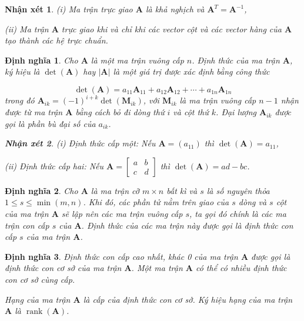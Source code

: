 \documentclass[12pt,a4paper,oneside]{report}
\newtheorem{nx}{Nhận xét}[section]
\newtheorem{dn}{Định nghĩa}[section]
\numberwithin{equation}{section}
\begin{document}
\begin{nx}
	\item[(i)] Ma trận trực giao $\mathbf{A}$ là khả nghịch và $\mathbf{A}^{T}=\mathbf{A}^{-1}$,
	
	\item[(ii)]  Ma trận $\mathbf{A}$ trực giao khi và chỉ khi các vector cột và các vector hàng của $\mathbf{A}$ tạo thành các hệ trực chuẩn.
\end{nx}
\begin{dn}\cite{hieu2019} 
	Cho $\mathbf{A}$ là một ma trận vuông cấp $n$. Định thức của ma trận $\mathbf{A}$, ký hiệu là $\operatorname{det}(\mathbf{A})$ hay $|\mathbf{A}|$ là một giá trị được xác định bằng công thức
	
	$$
	\operatorname{det}(\mathbf{A})=a_{11} \mathbf{A}_{11}+a_{12} \mathbf{A}_{12}+\cdots+a_{1 n} \mathbf{A}_{1 n}
	$$
	trong đó $\mathbf{A}_{i k}=(-1)^{i+k} \operatorname{det}\left(\mathbf{M}_{i k}\right)$, với $\mathbf{M}_{i k}$ là ma trận vuông cấp $n-1$ nhận được từ ma trận $\mathbf{A}$ bằng cách bỏ đi dòng thứ $i$ và cột thứ $k$. Đại lượng $\mathbf{A}_{i k}$ được gọi là phần bù đại số của $a_{i k}$.
\begin{nx}
	\item[(i)] Định thức cấp một: Nếu $\mathbf{A}=\left(a_{11}\right)$ thì $\operatorname{det}(\mathbf{A})=a_{11}$,
	
	\item[(ii)] Định thức cấp hai: Nếu $\mathbf{A}=\left[\begin{array}{ll}a & b \\ c & d\end{array}\right]$ thì $\operatorname{det}(\mathbf{A})=a d-b c$.
\end{nx}	
\end{dn}
\begin{dn}\cite{thuan2003}
	Cho $\mathbf{A}$ là ma trận cỡ $m \times n$ bất kì và $s$ là số nguyên thỏa $1 \leqslant s \leqslant \min (m, n)$. Khi đó, các phần tử nằm trên giao của $s$ dòng và $s$ cột của ma trận $\mathbf{A}$ sẽ lập nên các ma trận vuông cấp $s$, ta gọi đó chính là các ma trận con cấp $s$ của $\mathbf{A}$.
	Định thức của các ma trận này được gọi là định thức con cấp $s$ của ma trận $\mathbf{A}$.
\end{dn}
\begin{dn}\cite{hieu2019} 
	 Định thức con cấp cao nhất, khác 0 của ma trận $\mathbf{A}$ được gọi là định thức con cơ sở của ma trận $\mathbf{A}$. Một ma trận $\mathbf{A}$ có thể có nhiều định thức con cơ sở cùng cấp.
	
	Hạng của ma trận $\mathbf{A}$ là cấp của định thức con cơ sở. Ký hiệu hạng của ma trận $\mathbf{A}$ là $\operatorname{rank}(\mathbf{A})$.
\end{dn}
\end{document}

